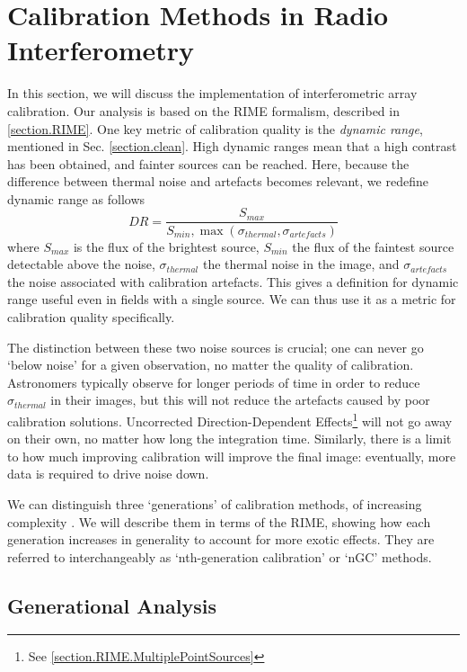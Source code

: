 
\section{Calibration Methods in Radio Interferometry}\label{section.calibration}
\pg
In this section, we will discuss the implementation of interferometric array calibration. Our analysis is based on the RIME formalism, described in \cref{section.RIME}. One key metric of calibration quality is the \emph{dynamic range}, mentioned in Sec. \ref{section.clean}. High dynamic ranges mean that a high contrast has been obtained, and fainter sources can be reached. Here, because the difference between thermal noise and artefacts becomes relevant, we redefine dynamic range as follows
\begin{equation}\label{eq.DR}
DR = \frac{S_{max}}{S_{min},\max(\sigma_{thermal},\sigma_{artefacts})}
\end{equation}
where $S_{max}$ is the flux of the brightest source, $S_{min}$ the flux of the faintest source detectable above the noise, $\sigma_{thermal}$ the thermal noise in the image, and $\sigma_{artefacts}$ the noise associated with calibration artefacts. This gives a definition for dynamic range useful even in fields with a single source. We can thus use it as a metric for calibration quality specifically.

\pg
The distinction between these two noise sources is crucial; one can never go `below noise' for a given observation, no matter the quality of calibration. Astronomers typically observe for longer periods of time in order to reduce $\sigma_{thermal}$ in their images, but this will not reduce the artefacts caused by poor calibration solutions. Uncorrected Direction-Dependent Effects\footnote{See \cref{section.RIME.MultiplePointSources}} will not go away on their own, no matter how long the integration time. Similarly, there is a limit to how much improving calibration will improve the final image: eventually, more data is required to drive noise down.

\pg
We can distinguish three `generations' of calibration methods, of increasing complexity . We will describe them in terms of the RIME, showing how each generation increases in generality to account for more exotic effects. They are referred to interchangeably as `nth-generation calibration' or `nGC' methods.

\subsection{Generational Analysis}

